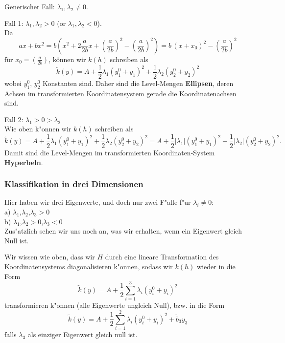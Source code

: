 Generischer Fall: $\lambda_1,\lambda_2\not = 0$.\par\medskip
{}
Fall 1: $\lambda_1,\lambda_2>0$ (or $\lambda_1,\lambda_2<0$).\\
Da 
$$ax+bx^2 
= b(x^2+2 \frac a{2b}x + \left(\frac a{2b}\right)^2- \left(\frac a{2b}\right)^2)
= b\,(x+x_0)^2 - \left(\frac a{2b}\right)^2$$
f\"ur $x_0 = \left(\frac a{2b}\right)$, k\"onnen wir $k(h)$ schreiben als 
$$ \tilde k(y) = A +\frac 1 2 \lambda_1 (y_1^0+y_1)^2 + \frac 1  2\lambda_2 (y_2^0+y_2)^2$$
wobei $y_1^0$, $y_2^0$ Konstanten sind. 
Daher sind die Level-Mengen {\bf Ellipsen}, deren Achsen 
im transformierten Koordinatensystem gerade die Koordinatenachsen sind. 
\par\medskip
Fall 2:  $\lambda_1>0>\lambda_2$\\
Wie oben k"onnen wir $k(h)$ schreiben als 
$$ \tilde k(y) = A +\frac 1 2 \lambda_1 (y_1^0+y_1)^2 + \frac 1 2 \lambda_2 (y_2^0+y_2)^2
= A + \frac 1 2 |\lambda_1| (y_1^0+y_1)^2 - \frac 1 2 |\lambda_2| (y_2^0+y_2)^2.
$$
Damit sind die Level-Mengen im transformierten Koordinaten-System 
{\bf Hyperbeln}.


\begin{auf}\cha\label{block1A6b}

\end{auf}



\subsubsection{Klassifikation in drei Dimensionen}
Hier haben wir drei Eigenwerte, und doch nur zwei F"alle 
f"ur $\lambda_i\not = 0$:\\
a) $\lambda_1$,$\lambda_2$,$\lambda_3>0$\\
b) $\lambda_1$,$\lambda_2>0$,\quad $\lambda_3<0$\\
Zus"atzlich sehen wir uns noch an, was wir erhalten, wenn ein Eigenwert gleich Null ist. \par\medskip{}
Wir wissen wie oben, dass wir $H$ durch eine lineare Transformation des Koordinatensystems
diagonalisieren k"onnen, sodass wir $k(h)$ wieder in die Form
$$\tilde k(y) = A + \frac 1 2 \sum_{i=1}^3\lambda_i (y_i^0+y_i)^2$$
transformieren k"onnen (alle Eigenwerte ungleich Null), bzw. in die Form 
$$\tilde k(y) = A + \frac 1 2 \sum_{i=1}^2\lambda_i (y_i^0+y_i)^2 + \tilde b_{3}y_{3}$$
falls $\lambda_{3}$ als einziger Eigenwert gleich null ist.
\par\medskip
 
